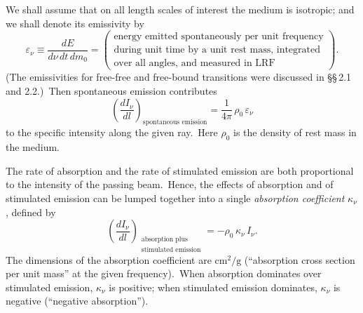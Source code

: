 We shall assume that on all length scales of interest the medium is isotropic;
and we shall denote its emissivity by
%
\begin{equation}
\varepsilon_\nu \equiv \frac{dE}{d\nu\,dt\,dm_0}
  = \begin{pmatrix} \text{energy emitted spontaneously per unit frequency}\\
    \text{during unit time by a unit rest mass, integrated}\\
    \text{over all angles, and measured in LRF} \end{pmatrix}.
\tag{2.6.16}
\end{equation}
%
(The emissivities for free-free and free-bound transitions were discussed in \S\S\,2.1
and 2.2.)\ Then spontaneous emission contributes
%
\begin{equation}
\left(\frac{dI_\nu}{dl}\right)_{\!\text{spontaneous emission}}
  = \frac{1}{4\pi}\,\rho_0\,\varepsilon_\nu
\tag{2.6.17}
\end{equation}
%
to the specific intensity along the given ray.\ Here $\rho_0$ is the density of rest mass
in the medium.

The rate of absorption and the rate of stimulated emission are both proportional
to the intensity of the passing beam.\ Hence, the effects of absorption and of
stimulated emission can be lumped together into a single \textit{absorption coefficient}
$\kappa_\nu$, defined by
%
\begin{equation}
\left(\frac{dI_\nu}{dl}\right)_{\!\substack{\text{absorption plus}\\[2pt]
  \text{stimulated emission}}}
  = -\rho_0\,\kappa_\nu\,I_\nu.
\tag{2.6.18}
\end{equation}
%
The dimensions of the absorption coefficient are $\mathrm{cm}^2/\mathrm{g}$ (``absorption cross section
per unit mass'' at the given frequency).\ When absorption dominates over
stimulated emission, $\kappa_\nu$ is positive; when stimulated emission dominates,
$\kappa_\nu$ is negative (``negative absorption'').

